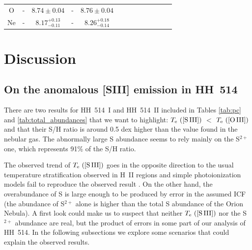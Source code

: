 \documentclass[fleqn,usenatbib]{mnras}
\begin{document}
\begin{table}
\begin{tabular}{ccccccccccccc}
O  &  - & $8.74 \pm 0.04$ &-&$8.76 \pm 0.04$\\ 

Ne  & - &$8.17 ^{+0.13} _{-0.11}$&-&$8.26 ^{+0.18} _{-0.14}$\\

\hline
\end{tabular}
\end{table}


\section{Discussion}
\label{sec:disc}


\subsection{On the anomalous [S\thinspace III] emission in HH~514}
\label{subsec:under_TS3}

There are two results for HH~514~I and HH~514~II included in Tables \ref{tab:pc} and \ref{tab:total_abundances}  that we want to highlight: $T_{\rm e} \text{ ([S\thinspace III])}$ $<$ $T_{\rm e} \text{ ([O\thinspace III])}$ and that their S/H ratio is around 0.5 dex higher than the value found in the nebular gas. The abnormally large S abundance seems to rely mainly on the S$^{2+}$ one, which represents 91\% of the S/H ratio.

The observed trend of $T_{\rm e} \text{ ([S\thinspace III])}$ goes in the opposite direction to the usual temperature stratification observed in H~II regions and simple photoionization models fail to reproduce the observed result \citep[][]{Binette2012}. On the other hand, the overabundance of S is large enough to be produced by error in the assumed ICF (the abundance of S$^{2+}$ alone is higher than the total S abundance of the Orion Nebula). A first look could make us to suspect that neither $T_{\rm e} \text{ ([S\thinspace III])}$ nor the S$^{2+}$ abundance are real, but the product of errors in some part of our analysis of HH~514. In the following subsections we explore some scenarios that could explain the observed results.
\end{document}
